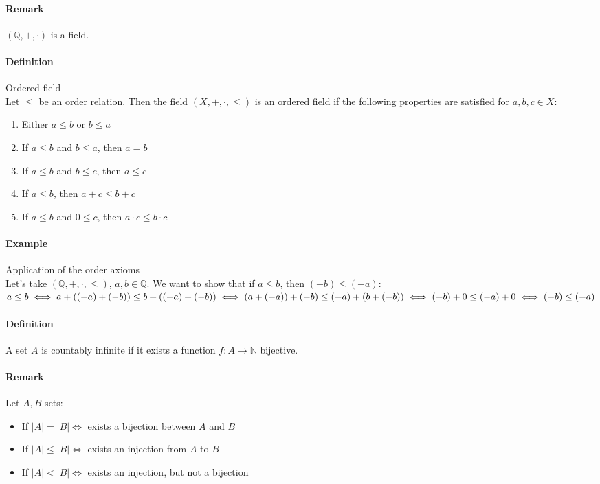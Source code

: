 \documentclass{article}
\newcommand{\functoN}[2]{#1 : #2 \rightarrow \mathbb{N}}
\newcommand{\Q}{\mathbb{Q}}
\newcommand{\Def}{\paragraph{Definition}}
\newcommand{\Remark}{\paragraph{Remark}}
\newcommand{\Example}{\paragraph{Example}}
\begin{document}
	\Remark $(\Q, +, \cdot)$ is a field.

	\Def Ordered field
\\Let $\leq$ be an order relation. Then the field $(X, +, \cdot, \leq)$ is an
	ordered field if the following properties are satisfied for $a, b, c\in X$:
	\begin{enumerate}[label=(\roman*)]
		\item Either $a \leq b$ or $b \leq a$

		\item If $a \leq b$ and $b \leq a$, then $a = b$

		\item If $a \leq b$ and $b \leq c$, then $a \leq c$

		\item If $a \leq b$, then $a + c \leq b + c$

		\item If $a \leq b$ and $0 \leq c$, then $a \cdot c \leq b \cdot c$
	\end{enumerate}

	\Example Application of the order axioms
\\Let's take $(\Q, +, \cdot, \leq)$, $a, b \in \Q$. We want to show that if $a
	\leq b$, then $(-b) \leq (-a)$:
\\$a \leq b \iff a + ((-a) + (-b)) \leq b + ((-a) + (-b)) \iff (a + (-a)) + (-b)
 	\leq (-a) + (b + (-b))
\\\iff (-b) + 0 \leq (-a) + 0 \iff (-b) \leq (-a)$

	\Def A set $A$ is countably infinite if it exists a function
	$\functoN{f}{A}$ bijective.

	\Remark Let $A, B$ sets:
	\begin{itemize}
		\item If $|A| = |B| \iff$ exists a bijection between $A$ and $B$

		\item If $|A| \leq |B| \iff$ exists an injection from $A$ to $B$

		\item If $|A| < |B| \iff$ exists an injection, but not a bijection
	\end{itemize}
\end{document}
